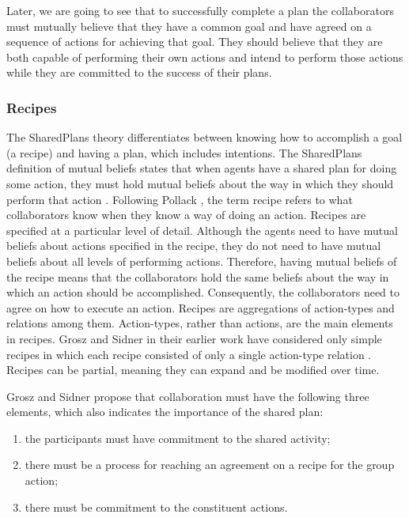 \documentclass[12pt]{report}
\begin{document}
Later, we are going to see that to successfully complete a plan the
collaborators must mutually believe that they have a common goal and have agreed
on a sequence of actions for achieving that goal. They should believe that they
are both capable of performing their own actions and intend to perform those
actions while they are committed to the success of their plans.

\subsubsection{Recipes}
\label{sec:recipe}

The SharedPlans theory differentiates between knowing how to accomplish a goal
(a recipe) and having a plan, which includes intentions. The SharedPlans
definition of mutual beliefs states that when agents have a shared plan for
doing some action, they must hold mutual beliefs about the way in which they
should perform that action \cite{grosz:collaboration,grosz:plans-discourse}.
Following Pollack \cite{pollack:plan-mental-attitudes}, the term recipe refers
to what collaborators know when they know a way of doing an action. Recipes are
specified at a particular level of detail. Although the agents need to have
mutual beliefs about actions specified in the recipe, they do not need to have
mutual beliefs about all levels of performing actions. Therefore, having mutual
beliefs of the recipe means that the collaborators hold the same beliefs
about the way in which an action should be accomplished. Consequently, the
collaborators need to agree on how to execute an action. Recipes are
aggregations of action-types and relations among them. Action-types, rather than
actions, are the main elements in recipes. Grosz and Sidner in their earlier
work \cite{grosz:plans-discourse} have considered only simple recipes in which
each recipe consisted of only a single action-type relation
\cite{lochbaum:plan-models}. Recipes can be partial, meaning they can expand and
be modified over time.

Grosz and Sidner propose that collaboration must have the following three
elements, which also indicates the importance of the shared plan:

\begin{enumerate}
  \item the participants must have commitment to the shared activity;
  \item there must be a process for reaching an agreement on a recipe for the
  group action;
  \item there must be commitment to the constituent actions. 
\end{enumerate}
\end{document}
